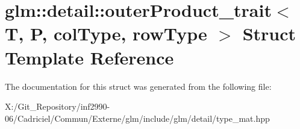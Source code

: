 \hypertarget{structglm_1_1detail_1_1outer_product__trait}{\section{glm\-:\-:detail\-:\-:outer\-Product\-\_\-trait$<$ T, P, col\-Type, row\-Type $>$ Struct Template Reference}
\label{structglm_1_1detail_1_1outer_product__trait}
}


The documentation for this struct was generated from the following file\-:\begin{DoxyCompactItemize}
\item 
X\-:/\-Git\-\_\-\-Repository/inf2990-\/06/\-Cadriciel/\-Commun/\-Externe/glm/include/glm/detail/type\-\_\-mat.\-hpp\end{DoxyCompactItemize}
